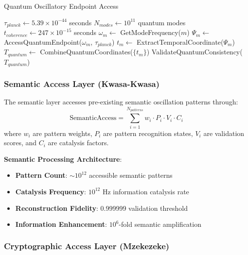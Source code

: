 ﻿\documentclass[11pt,a4paper]{article}
\begin{document}
\begin{itemize}
\begin{itemize}
\begin{algorithm}
\caption{Quantum Oscillatory Endpoint Access}
\begin{algorithmic}
    \State $\tau_{planck} \leftarrow 5.39 \times 10^{-44}$ seconds
    \State $N_{modes} \leftarrow 10^{11}$ quantum modes
    \State $t_{coherence} \leftarrow 247 \times 10^{-15}$ seconds
        \State $\omega_m \leftarrow$ GetModeFrequency($m$)
        \State $\Psi_m \leftarrow$ AccessQuantumEndpoint($\omega_m$, $\tau_{planck}$)
        \State $t_m \leftarrow$ ExtractTemporalCoordinate($\Psi_m$)
    \EndFor
    \State $T_{quantum} \leftarrow$ CombineQuantumCoordinates($\{t_m\}$)
    \State \Return ValidateQuantumConsistency($T_{quantum}$)
\EndProcedure
\end{algorithmic}
\end{algorithm}

\subsubsection{Semantic Access Layer (Kwasa-Kwasa)}

\begin{definition}
The semantic layer accesses pre-existing semantic oscillation patterns through:
\begin{equation}
\text{SemanticAccess} = \sum_{i=1}^{N_{patterns}} w_i \cdot P_i \cdot V_i \cdot C_i
\end{equation}
where $w_i$ are pattern weights, $P_i$ are pattern recognition states, $V_i$ are validation scores, and $C_i$ are catalysis factors.
\end{definition}

\textbf{Semantic Processing Architecture}:
\begin{itemize}
\item \textbf{Pattern Count}: $\sim 10^{12}$ accessible semantic patterns
\item \textbf{Catalysis Frequency}: $10^{12}$ Hz information catalysis rate
\item \textbf{Reconstruction Fidelity}: 0.999999 validation threshold
\item \textbf{Information Enhancement}: $10^6$-fold semantic amplification
\end{itemize}

\subsubsection{Cryptographic Access Layer (Mzekezeke)}


\end{itemize}
\end{itemize}
\end{document}
